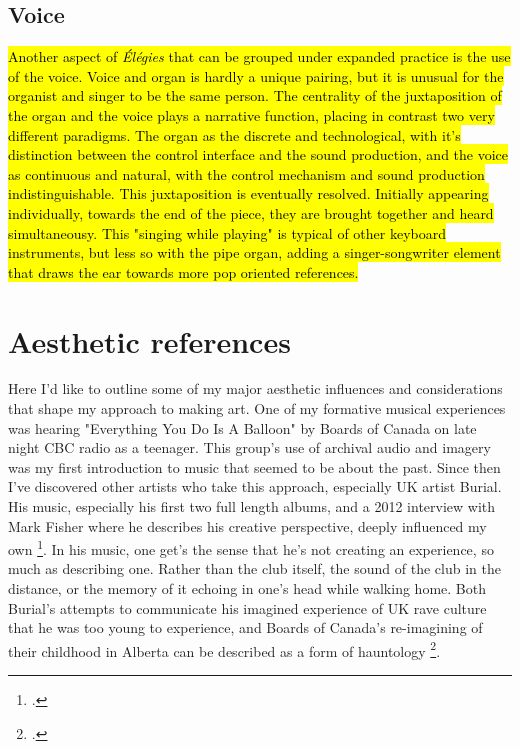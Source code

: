 \documentclass[12pt,twoside,maitrise]{dms_ks}
\theoremstyle{definition}
\begin{document}
{\subsection{Voice}

\hl{Another aspect of \textit{Élégies} that can be grouped under expanded practice is the use of the voice. 
Voice and organ is hardly a unique pairing, but it is unusual for the organist and singer to be the same person.
The centrality of the juxtaposition of the organ and the voice plays a narrative function, placing in contrast two very different paradigms.
The organ as the discrete and technological, with it's distinction between the control interface and the sound production, and the voice as continuous and natural, with the control mechanism and sound production indistinguishable. 
This juxtaposition is eventually resolved.
Initially appearing individually, towards the end of the piece, they are brought together and heard simultaneousy.
This "singing while playing" is typical of other keyboard instruments, but less so with the pipe organ, adding a singer-songwriter element that draws the ear towards more pop oriented references.}


\section{Aesthetic references}

Here I'd like to outline some of my major aesthetic influences and considerations that shape my approach to making art. 
One of my formative musical experiences was hearing "Everything You Do Is A Balloon" by Boards of Canada on late night CBC radio as a teenager. 
This group's use of archival audio and imagery was my first introduction to music that seemed to be about the past. 
Since then I've discovered other artists who take this approach, especially UK artist Burial. 
His music, especially his first two full length albums, and a 2012 interview with Mark Fisher where he describes his creative perspective, deeply influenced my own \footcite{fisher_burial_2012}. 
In his music, one get's the sense that he's not creating an experience, so much as describing one. 
Rather than the club itself, the sound of the club in the distance, or the memory of it echoing in one's head while walking home. 
Both Burial's attempts to communicate his imagined experience of UK rave culture that he was too young to experience, and Boards of Canada's re-imagining of their childhood in Alberta can be described as a form of hauntology \footcite{alary_vers_2020}.

}
\end{document}
